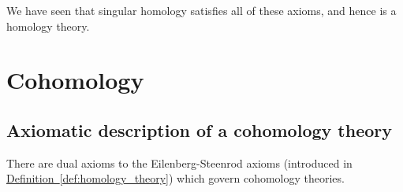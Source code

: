 \documentclass[main.tex]{subfiles}
\begin{document}
We have seen that singular homology satisfies all of these axioms, and hence is a homology theory.

\chapter{Cohomology}
\label{ch:cohomology}

\section{Axiomatic description of a cohomology theory}
\label{sec:axiomatic_description_of_a_cohomology_theory}

There are dual axioms to the Eilenberg-Steenrod axioms (introduced in \hyperref[def:homology_theory]{Definition~\ref*{def:homology_theory}}) which govern cohomology theories.
\end{document}
